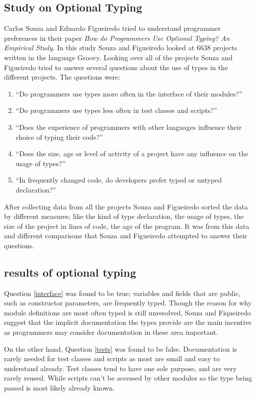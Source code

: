 \documentclass{sig-alternate}
\begin{document}
\subsection{Study on Optional Typing}
Carlos Souza and Eduardo Figueiredo tried to understand programmer preferences in their paper \emph{How do Programmers Use Optional Typing? An Empirical Study}. In this study Souza and Figueiredo looked at 6638 projects written in the language Groovy. Looking over all of the projects Souza and Figueiredo tried to answer several questions about the use of types in the different projects. The questions were: 
\begin{enumerate}
\item \label{interface} ``Do programmers use types more often in the interface of their modules?''
\item \label{tests} ``Do programmers use types less often in test classes and scripts?''
\item \label{experience} ``Does the experience of programmers with other languages influence their choice of typing their code?''
\item \label{sizeageactivity} ``Does the size, age or level of activity of a project have any influence on the usage of types?''
\item \label{changed} ``In frequently changed code, do developers prefer typed or untyped declaration?'' 
\end{enumerate}
After collecting data from all the projects Souza and Figueiredo sorted the data by different measures; like the kind of type declaration, the usage of types, the size of the project in lines of code, the age of the program. It was from this data and different comparisons that Souza and Figueiredo attempted to answer their questions.

\subsection{results of optional typing}
Question \ref{interface} was found to be true; variables and fields that are public, such as constructor parameters, are frequently typed. Though the reason for why module definitions are most often typed is still unresolved, Souza and Fiqueiredo suggest that the implicit documentation the types provide are the main incentive as programmers may consider documentation in these area important.

On the other hand, Question \ref{tests} was found to be false. Documentation is rarely needed for test classes and scripts as most are small and easy to understand already. Test classes tend to have one sole purpose, and are very rarely reused. While scripts can't be accessed by other modules so the type being passed is most likely already known. 
\end{document}

